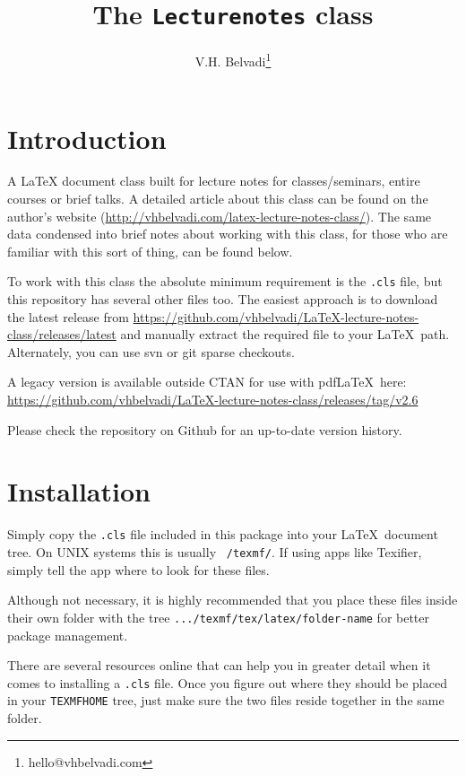 \documentclass[a4paper,margin=1in]{article}
\title{The \texttt{Lecturenotes} class}
\author{V.H. Belvadi\thanks{hello@vhbelvadi.com}}
\begin{document}
\maketitle
\tableofcontents

\section{Introduction}

A LaTeX document class built for lecture notes for classes/seminars, entire courses or brief talks. A detailed article about this class can be found on the author's website (\url{http://vhbelvadi.com/latex-lecture-notes-class/}). The same data condensed into brief notes about working with this class, for those who are familiar with this sort of thing, can be found below.

To work with this class the absolute minimum requirement is the \texttt{.cls} file, but this repository has several other files too. The easiest approach is to download the latest release from \url{https://github.com/vhbelvadi/LaTeX-lecture-notes-class/releases/latest} and manually extract the required file to your \LaTeX\ path. Alternately, you can use svn or git sparse checkouts.

A legacy version is available outside CTAN for use with pdf\LaTeX\ here: \url{https://github.com/vhbelvadi/LaTeX-lecture-notes-class/releases/tag/v2.6}

Please check the repository on Github for an up-to-date version history.

\section{Installation}

Simply copy the \texttt{.cls} file included in this package into your \LaTeX\ document tree. On UNIX systems this is usually \texttt{~/texmf/}. If using apps like Texifier, simply tell the app where to look for these files.

Although not necessary, it is highly recommended that you place these files inside their own folder with the tree \texttt{.../texmf/tex/latex/folder-name} for better package management.

There are several resources online that can help you in greater detail when it comes to installing a \texttt{.cls} file. Once you figure out where they should be placed in your \texttt{TEXMFHOME} tree, just make sure the two files reside together in the same folder.
\end{document}
